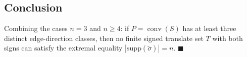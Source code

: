 \subsection*{Conclusion}

Combining the cases $n=3$ and $n\ge 4$: if $P=\operatorname{conv}(S)$ has at
least three distinct edge-direction classes, then no finite signed translate
set $T$ with both signs can satisfy the extremal equality $|\mathrm{supp}(\tilde\sigma)|=n$.
$\blacksquare$
